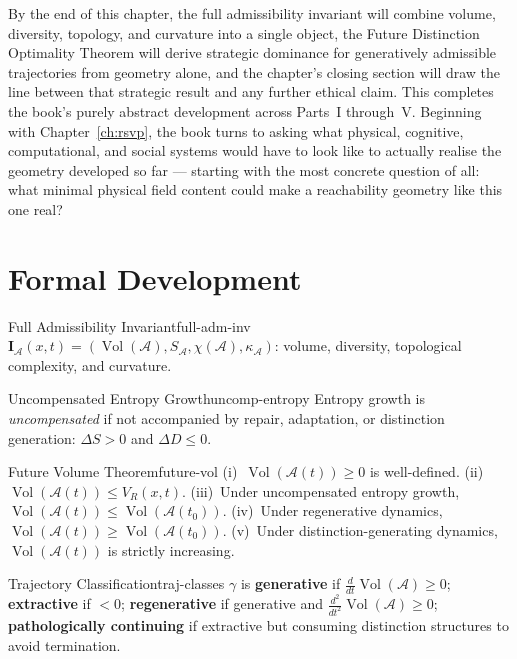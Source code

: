 \documentclass[12pt,twoside,openright]{book}
\newcommand{\adm}{\mathcal{A}}
\newcommand{\Vol}{\operatorname{Vol}}
\begin{document}
By the end of this chapter, the full admissibility invariant
will combine volume, diversity, topology, and curvature into
a single object, the Future Distinction Optimality Theorem
will derive strategic dominance for generatively admissible
trajectories from geometry alone, and the chapter's closing
section will draw the line between that strategic result and
any further ethical claim. This completes the book's purely
abstract development across Parts~I through~V. Beginning with
Chapter~\ref{ch:rsvp}, the book turns to asking what physical,
cognitive, computational, and social systems would have to
look like to actually realise the geometry developed so far
--- starting with the most concrete question of all: what
minimal physical field content could make a reachability
geometry like this one real?

\section{Formal Development}
\label{sec:ch15-formal}

\begin{definition}{Full Admissibility Invariant}{full-adm-inv}
  $\mathbf{I}_\adm(x,t)
  =(\Vol(\adm),S_\adm,\chi(\adm),\kappa_\adm)$:
  volume, diversity, topological complexity, and curvature.
\end{definition}

\begin{definition}{Uncompensated Entropy Growth}{uncomp-entropy}
  Entropy growth is \emph{uncompensated} if not accompanied
  by repair, adaptation, or distinction generation:
  $\Delta S>0$ and $\Delta D\le0$.
\end{definition}

\begin{theorem}{Future Volume Theorem}{future-vol}
  (i)~$\Vol(\adm(t))\ge0$ is well-defined.
  (ii)~$\Vol(\adm(t))\le V_R(x,t)$.
  (iii)~Under uncompensated entropy growth,
  $\Vol(\adm(t))\le\Vol(\adm(t_0))$.
  (iv)~Under regenerative dynamics,
  $\Vol(\adm(t))\ge\Vol(\adm(t_0))$.
  (v)~Under distinction-generating dynamics,
  $\Vol(\adm(t))$ is strictly increasing.
\end{theorem}

\begin{definition}{Trajectory Classification}{traj-classes}
  $\gamma$ is \textbf{generative} if
  $\frac{d}{dt}\Vol(\adm)\ge0$;
  \textbf{extractive} if $<0$;
  \textbf{regenerative} if generative and
  $\frac{d^2}{dt^2}\Vol(\adm)\ge0$;
  \textbf{pathologically continuing} if extractive but
  consuming distinction structures to avoid termination.
\end{definition}
\end{document}
